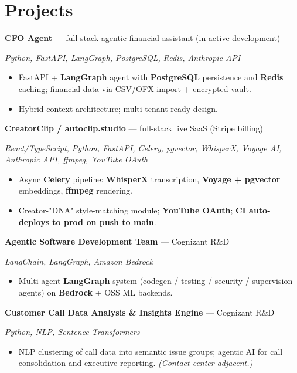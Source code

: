 \documentclass[10pt]{article}
\begin{document}
\section*{Projects}
\noindent\textbf{CFO Agent} --- full-stack agentic financial assistant (in active development)\par
\noindent\textit{Python, FastAPI, LangGraph, PostgreSQL, Redis, Anthropic API}\par
\begin{itemize}
  \item FastAPI + \textbf{LangGraph} agent with \textbf{PostgreSQL} persistence and \textbf{Redis} caching; financial data via CSV/OFX import + encrypted vault.
  \item Hybrid context architecture; multi-tenant-ready design.
\end{itemize}
\noindent\textbf{CreatorClip / autoclip.studio} --- full-stack live SaaS (Stripe billing)\par
\noindent\textit{React/TypeScript, Python, FastAPI, Celery, pgvector, WhisperX, Voyage AI, Anthropic API, ffmpeg, YouTube OAuth}\par
\begin{itemize}
  \item Async \textbf{Celery} pipeline: \textbf{WhisperX} transcription, \textbf{Voyage + pgvector} embeddings, \textbf{ffmpeg} rendering.
  \item Creator-"DNA" style-matching module; \textbf{YouTube OAuth}; \textbf{CI auto-deploys to prod on push to main}.
\end{itemize}
\noindent\textbf{Agentic Software Development Team} --- Cognizant R\&D\par
\noindent\textit{LangChain, LangGraph, Amazon Bedrock}\par
\begin{itemize}
  \item Multi-agent \textbf{LangGraph} system (codegen / testing / security / supervision agents) on \textbf{Bedrock} + OSS ML backends.
\end{itemize}
\noindent\textbf{Customer Call Data Analysis \& Insights Engine} --- Cognizant R\&D\par
\noindent\textit{Python, NLP, Sentence Transformers}\par
\begin{itemize}
  \item NLP clustering of call data into semantic issue groups; agentic AI for call consolidation and executive reporting. \textit{(Contact-center-adjacent.)}
\end{itemize}
\end{document}
